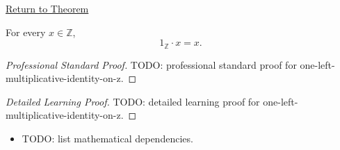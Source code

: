\newpage
{}
\label{prf:one-left-multiplicative-identity-on-z}

\begin{remark*}[Return]
\hyperref[thm:one-left-multiplicative-identity-on-z]{Return to Theorem}
\end{remark*}

\begin{theorem*}
For every $x\in\mathbb{Z}$,
\[
1_{\mathbb{Z}}\cdot x=x.
\]
\end{theorem*}

\begin{proof}[Professional Standard Proof]
\LRAProofBodyStart
TODO: professional standard proof for one-left-multiplicative-identity-on-z.
\end{proof}

\begin{proof}[Detailed Learning Proof]
\LRAProofBodyStart
TODO: detailed learning proof for one-left-multiplicative-identity-on-z.
\end{proof}

\begin{remark*}
\end{remark*}

\begin{dependencies}
\begin{itemize}
  \item TODO: list mathematical dependencies.
\end{itemize}
\end{dependencies}

\clearpage
